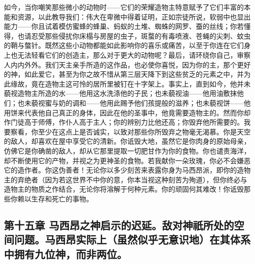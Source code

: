 如今，当你嘲笑那些微小的动物时——它们的荣耀造物主特意赋予了它们丰富的本能和资源，以此教导我们：伟大在卑微中得着证明，正如宗徒所说，软弱中也显出能力——你且试着模仿蜜蜂的蜂巢、蚂蚁的土堆、蜘蛛的网罗、蚕的丝线；你若懂得，也请忍受那些侵扰你床榻与房屋的虫子，斑蝥的有毒喷液、苍蝇的尖刺、蚊虫的鞘与螫针。既然这些小动物都能如此影响你的喜乐或痛苦，以至于你连在它们身上也无法轻看它们的创造主，那么对于更大的动物呢？最后，请环绕你自己，审察人内内外外。我们天主亲手所造的这作品，也必使你喜悦，因为你的主，那个更好的神，如此爱它，甚至为你之故不惜从第三层天降下到这些贫乏的元素之中，并为此缘故，竟在造物主这可怜的居所里被钉在十字架上。事实上，直到如今，他并未藐视造物主所造的水——他用这水洗涤他的子民；也未藐视油——他用油敷抹他们；也未藐视蜜与奶的调和——他用此赐予他们孩提般的滋养；也未藐视饼——他用饼来代表他自己真正的身体，因此在他的圣事中，他竟需要造物主的。然而你却作门徒高于师傅，作仆人高于主人；你的辨别力比他还高；你毁弃他所需要的。我要察看，你至少在这点上是否诚实，以致对那些你所毁弃之物毫无渴慕。你是天空的敌人，却喜欢在屋中享受它的清新。你诋毁大地，虽然它是你肉身的原始母亲，仿佛它是你确凿的敌人，却从它那里提取一切肥甘作为你的食物。你也谴责海洋，却不断使用它的产物，并视之为更神圣的食物。若我献你一朵玫瑰，你必不会嫌恶它的造作者。你这伪善者！无论你以多少刻苦来表露你身为马西昂派，即你的造物主的弃绝者（因为若这世界不中你的意，你本当视这种刻苦为殉道），但你终必与造物主的物质之作结合，无论你将溶解于何种元素。你的顽固何其难改！你诋毁那些你赖以生存和死亡的事物。\par


\subsection{第十五章 马西昂之神启示的迟延。敌对神祇所处的空间问题。马西昂实际上（虽然似乎无意识地）在其体系中拥有九位神，而非两位。}


